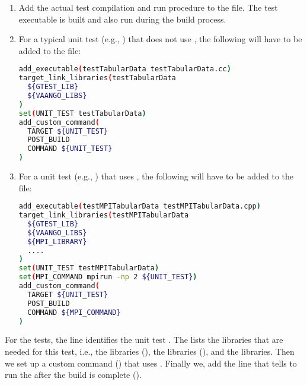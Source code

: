 \begin{enumerate}
  \item  Add the actual test compilation and run procedure to the 
         file.  The test executable is built and also run during the build process.
  \item  For a typical unit test (e.g., ) that does not 
         use , the following will 
         have to be added to the  file:
\begin{lstlisting}[language=sh, backgroundcolor=\color{background}]
add_executable(testTabularData testTabularData.cc)
target_link_libraries(testTabularData
  ${GTEST_LIB}
  ${VAANGO_LIBS}
)
set(UNIT_TEST testTabularData)
add_custom_command(
  TARGET ${UNIT_TEST}
  POST_BUILD
  COMMAND ${UNIT_TEST}
)
\end{lstlisting}

  \item  For a unit test (e.g., ) that uses
         , the following will 
         have to be added to the  file:
\begin{lstlisting}[language=sh, backgroundcolor=\color{background}]
add_executable(testMPITabularData testMPITabularData.cpp)
target_link_libraries(testMPITabularData
  ${GTEST_LIB}
  ${VAANGO_LIBS}
  ${MPI_LIBRARY}
  ....
)
set(UNIT_TEST testMPITabularData)
set(MPI_COMMAND mpirun -np 2 ${UNIT_TEST})
add_custom_command(
  TARGET ${UNIT_TEST}
  POST_BUILD
  COMMAND ${MPI_COMMAND}
)
\end{lstlisting}
\end{enumerate}

\begin{NoteBox}
For the  tests, the  line identifies the unit test 
. The  lists 
the libraries that are needed for this test, i.e.,  the 
libraries (), the \Vaango libraries (),
and the  libraries.
Then we set up a custom command () that uses .
Finally we, add the  line that tells  
to run the  after the build is complete ().
\end{NoteBox}

